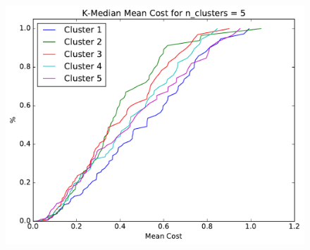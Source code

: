 \documentclass[11pt]{article}
\newcommand{\D}{\textsf{D}}
\begin{document}
\begin{figure}[H]
\centering
\includegraphics[width=.75\textwidth]{cdf_median_n-5.pdf}
\end{figure}






\end{document}
